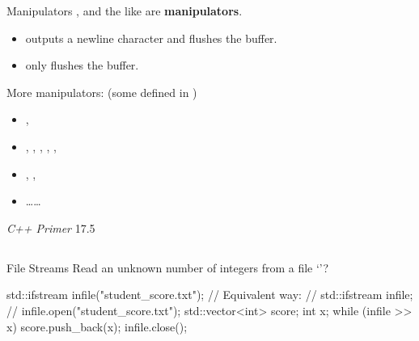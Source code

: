 \begin{frame}[fragile]{Manipulators}
    ,  and the like are \textbf{manipulators}.
    \begin{itemize}
        \item {} outputs a newline character and flushes the buffer.
        \item {} only flushes the buffer.
    \end{itemize}
    More manipulators: (some defined in )
    \begin{itemize}
        \item {}, 
        \item {}, , , , , 
        \item {}, , 
        \item \dots\dots
    \end{itemize}
    \textit{C++ Primer} 17.5
\end{frame}

\subsection{}

\begin{frame}[fragile]{File Streams}
    Read an unknown number of integers from a file `'?
    \begin{cpp}
std::ifstream infile("student_score.txt");
// Equivalent way:
// std::ifstream infile;
// infile.open("student_score.txt");
std::vector<int> score;
int x;
while (infile >> x)
  score.push_back(x);
infile.close();
    \end{cpp}
\end{frame}

